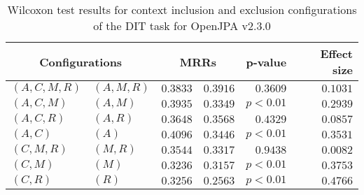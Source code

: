 
\begin{table}
\begin{spacing}{1.2}
\centering
\caption{Wilcoxon test results for context inclusion and exclusion configurations of the DIT task for OpenJPA v2.3.0}
\label{table:versus-wilcox-openjpa-dit-context}
\begin{tabular}{ll|rr|rr}
\toprule
      \multicolumn{2}{c|}{Configurations} &          \multicolumn{2}{c|}{MRRs} &       p-value & Effect size \\
\midrule
 $(A,C,M,R)$ &  $(A,M,R)$ & $0.3833$ & $0.3916$ & $0.3609$ &    $0.1031$ \\
   $(A,C,M)$ &    $(A,M)$ & $0.3935$ & $0.3349$ & $p<0.01$ &    $0.2939$ \\
   $(A,C,R)$ &    $(A,R)$ & $0.3648$ & $0.3568$ & $0.4329$ &    $0.0857$ \\
     $(A,C)$ &      $(A)$ & $0.4096$ & $0.3446$ & $p<0.01$ &    $0.3531$ \\
   $(C,M,R)$ &    $(M,R)$ & $0.3544$ & $0.3317$ & $0.9438$ &    $0.0082$ \\
     $(C,M)$ &      $(M)$ & $0.3236$ & $0.3157$ & $p<0.01$ &    $0.3753$ \\
     $(C,R)$ &      $(R)$ & $0.3256$ & $0.2563$ & $p<0.01$ &    $0.4766$ \\
\bottomrule
\end{tabular}

\end{spacing}
\end{table}

